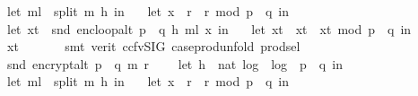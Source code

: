 \begin{isabellebody}
\ \ let\ m{\isacharunderscore}{\kern0pt}l\ {\isacharequal}{\kern0pt}\ split\ m\ h\ in\ \isanewline
\ \ let\ x{\isacharunderscore}{\kern0pt}{}\ {\isacharequal}{\kern0pt}\ {\isacharparenleft}{\kern0pt}r\ {\isacharasterisk}{\kern0pt}\ r{\isacharparenright}{\kern0pt}\ mod\ {\isacharparenleft}{\kern0pt}p\ {\isacharasterisk}{\kern0pt}\ q{\isacharparenright}{\kern0pt}\ in\ \isanewline
\ \ let\ x{\isacharunderscore}{\kern0pt}t\ {\isacharequal}{\kern0pt}\ snd\ {\isacharparenleft}{\kern0pt}enc{\isacharunderscore}{\kern0pt}loop{\isacharunderscore}{\kern0pt}alt\ {\isacharparenleft}{\kern0pt}p\ {\isacharasterisk}{\kern0pt}\ q{\isacharcomma}{\kern0pt}\ h{\isacharcomma}{\kern0pt}\ m{\isacharunderscore}{\kern0pt}l{\isacharparenright}{\kern0pt}\ x{\isacharunderscore}{\kern0pt}{}{\isacharparenright}{\kern0pt}\ in\ \isanewline
\ \ let\ x{\isacharunderscore}{\kern0pt}t{\isacharprime}{\kern0pt}\ {\isacharequal}{\kern0pt}\ x{\isacharunderscore}{\kern0pt}t\ {\isacharasterisk}{\kern0pt}\ x{\isacharunderscore}{\kern0pt}t\ mod\ {\isacharparenleft}{\kern0pt}p\ {\isacharasterisk}{\kern0pt}\ q{\isacharparenright}{\kern0pt}\ in\ \isanewline
\ \ x{\isacharunderscore}{\kern0pt}t{\isacharprime}{\kern0pt}{\isacharparenright}{\kern0pt}{\isachardoublequoteclose}\ \isanewline
\ \ \ \ \isamarkupfalse%
\ {\isacharparenleft}{\kern0pt}smt\ {\isacharparenleft}{\kern0pt}verit{\isacharcomma}{\kern0pt}\ ccfv{\isacharunderscore}{\kern0pt}SIG{\isacharparenright}{\kern0pt}\ case{\isacharunderscore}{\kern0pt}prod{\isacharunderscore}{\kern0pt}unfold\ prod{\isachardot}{\kern0pt}sel{\isacharparenleft}{\kern0pt}{}{\isacharparenright}{\kern0pt}{\isacharparenright}{\kern0pt}\isanewline
\isanewline
\ \ \isamarkupfalse%
\ \isamarkupfalse%
\ \ {\isachardoublequoteopen}snd\ {\isacharparenleft}{\kern0pt}encrypt{\isacharunderscore}{\kern0pt}alt\ {\isacharparenleft}{\kern0pt}p\ {\isacharasterisk}{\kern0pt}\ q{\isacharparenright}{\kern0pt}\ m\ r{\isacharparenright}{\kern0pt}\ \isanewline
\ \ {\isacharequal}{\kern0pt}\ {\isacharparenleft}{\kern0pt}let\ h\ {\isacharequal}{\kern0pt}\ nat\ {\isasymlfloor}log\ {}\ {\isacharparenleft}{\kern0pt}log\ {}\ {\isacharparenleft}{\kern0pt}p\ {\isacharasterisk}{\kern0pt}\ q{\isacharparenright}{\kern0pt}{\isacharparenright}{\kern0pt}{\isasymrfloor}\ in\ \isanewline
\ \ let\ m{\isacharunderscore}{\kern0pt}l\ {\isacharequal}{\kern0pt}\ split\ m\ h\ in\ \isanewline
\ \ let\ x{\isacharunderscore}{\kern0pt}{}\ {\isacharequal}{\kern0pt}\ {\isacharparenleft}{\kern0pt}r\ {\isacharasterisk}{\kern0pt}\ r{\isacharparenright}{\kern0pt}\ mod\ {\isacharparenleft}{\kern0pt}p\ {\isacharasterisk}{\kern0pt}\ q{\isacharparenright}{\kern0pt}\ in\ \isanewline

\end{isabellebody}
